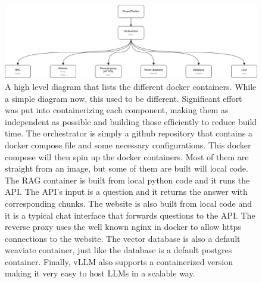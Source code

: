\begin{figure}[H]
    \captionsetup{justification=centering}
    \centerline{\includegraphics[width=1\linewidth]{fig/Architecture Docker.png}}
    \caption{A high level diagram that lists the different docker containers. While a simple diagram now, this used to be different. Significant effort was put into containerizing each component, making them as independent as possible and building those efficiently to reduce build time. The orchestrator is simply a github repository that contains a docker compose file and some necessary configurations. This docker compose will then spin up the docker containers. Most of them are straight from an image, but some of them are built will local code. The RAG container is built from local python code and it runs the API. The API's input is a question and it returns the answer with corresponding chunks. The website is also built from local code and it is a typical chat interface that forwards questions to the API. The reverse proxy uses the well known nginx in docker to allow https connections to the website. The vector database is also a default weaviate container, just like the database is a default postgres container. Finally, vLLM also supports a containerized version making it very easy to host LLMs in a scalable way.}
    \label{fig:architecture_docker}
\end{figure}

